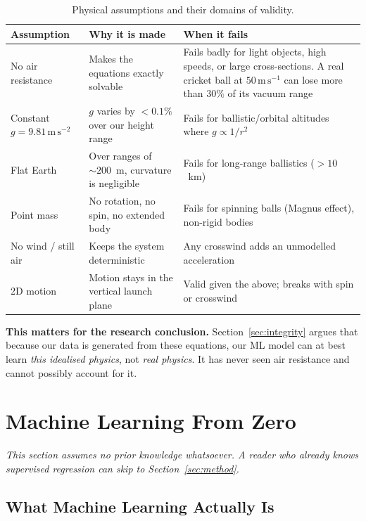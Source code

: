 \documentclass[11pt,a4paper]{article}
\newcommand{\msq}{\,\mathrm{m\,s^{-2}}}
\newcommand{\ms}{\,\mathrm{m\,s^{-1}}}
\begin{document}
\begin{table}[h]
\centering
\small
\caption{Physical assumptions and their domains of validity.}
\begin{tabular}{@{}p{3.4cm}p{4.6cm}p{6.2cm}@{}}
\toprule
\textbf{Assumption} & \textbf{Why it is made} & \textbf{When it fails} \\
\midrule
No air resistance & Makes the equations exactly solvable &
  Fails badly for light objects, high speeds, or large cross-sections. A real cricket ball at
  $50\ms$ can lose more than $30\%$ of its vacuum range \\
Constant $g=9.81\msq$ & $g$ varies by ${<}0.1\%$ over our height range &
  Fails for ballistic/orbital altitudes where $g\propto 1/r^{2}$ \\
Flat Earth & Over ranges of ${\sim}200$~m, curvature is negligible &
  Fails for long-range ballistics (${>}10$~km) \\
Point mass & No rotation, no spin, no extended body &
  Fails for spinning balls (Magnus effect), non-rigid bodies \\
No wind / still air & Keeps the system deterministic &
  Any crosswind adds an unmodelled acceleration \\
2D motion & Motion stays in the vertical launch plane &
  Valid given the above; breaks with spin or crosswind \\
\bottomrule
\end{tabular}
\end{table}

\textbf{This matters for the research conclusion.} Section~\ref{sec:integrity} argues that because
our data is generated from these equations, our ML model can at best learn \emph{this idealised
physics}, not \emph{real physics}. It has never seen air resistance and cannot possibly account
for it.

\section{Machine Learning From Zero}\label{sec:mlzero}

\textit{This section assumes no prior knowledge whatsoever. A reader who already knows supervised
regression can skip to Section~\ref{sec:method}.}

\subsection{What Machine Learning Actually Is}
\end{document}
